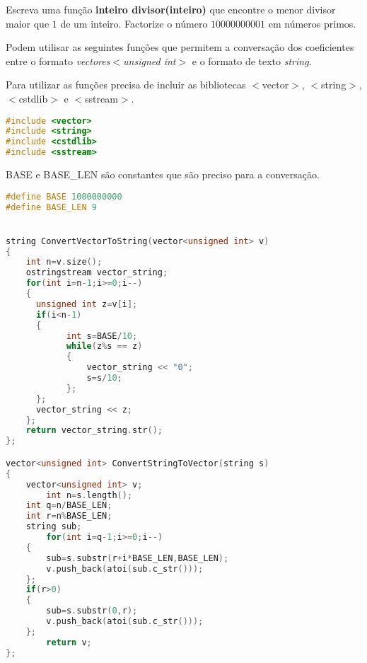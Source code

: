 \nextexer{} Escreva uma função {\bf inteiro divisor(inteiro)} que encontre o menor divisor maior que $1$ de um inteiro. Factorize o número $10000000001$ em números primos.
\newpage



Podem utilisar as seguintes funções que permitem a conversação dos coeficientes entre o formato {\it vectores$<$unsigned int$>$} e o formato de texto {\it string}.

Para utilizar as funções precisa de incluir as bibliotecas $<$vector$>$, $<$string$>$, $<$cstdlib$>$ e $<$sstream$>$.

\begin{lstlisting}[language=C++]
#include <vector>
#include <string>
#include <cstdlib>
#include <sstream>
\end{lstlisting}

BASE e BASE\_LEN são constantes que são preciso para a conversação.
\begin{lstlisting}[language=C++]
#define BASE 1000000000
#define BASE_LEN 9


string ConvertVectorToString(vector<unsigned int> v)
{
	int n=v.size();
	ostringstream vector_string;
	for(int i=n-1;i>=0;i--)
	{
	  unsigned int z=v[i];
	  if(i<n-1)
	  {
            int s=BASE/10;
            while(z%s == z)
            {
                vector_string << "0";
                s=s/10;
            };
	  };
	  vector_string << z;        
	};
	return vector_string.str();
};

vector<unsigned int> ConvertStringToVector(string s)
{
	vector<unsigned int> v;
        int n=s.length();
	int q=n/BASE_LEN;
	int r=n%BASE_LEN;
	string sub;
        for(int i=q-1;i>=0;i--)
	{
		sub=s.substr(r+i*BASE_LEN,BASE_LEN);				
		v.push_back(atoi(sub.c_str()));
	};
	if(r>0)
	{ 
		sub=s.substr(0,r);
		v.push_back(atoi(sub.c_str()));
	};
        return v;
};
\end{lstlisting}









